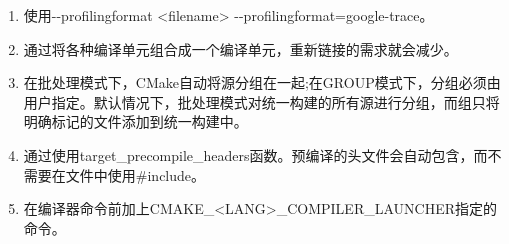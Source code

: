 

\begin{enumerate}
\item 
使用-{}-profilingformat <filename> -{}-profilingformat=google-trace。

\item
通过将各种编译单元组合成一个编译单元，重新链接的需求就会减少。

\item 
在批处理模式下，CMake自动将源分组在一起;在GROUP模式下，分组必须由用户指定。默认情况下，批处理模式对统一构建的所有源进行分组，而组只将明确标记的文件添加到统一构建中。

\item 
通过使用target\_precompile\_headers函数。预编译的头文件会自动包含，而不需要在文件中使用\#include。

\item 
在编译器命令前加上CMAKE\_<LANG>\_COMPILER\_LAUNCHER指定的命令。
\end{enumerate}